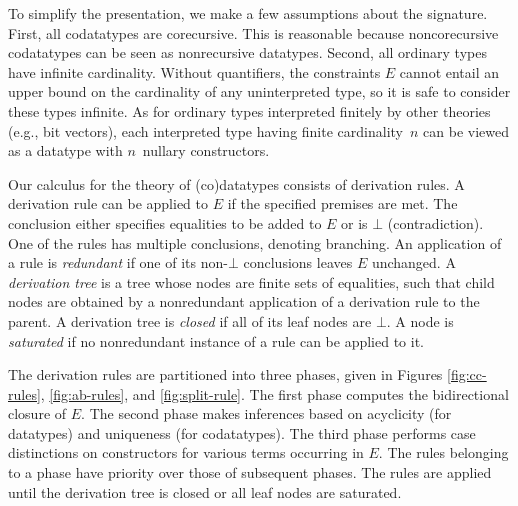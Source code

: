 \documentclass[letter]{article}
\theoremstyle{plain}
\theoremstyle{definition}
\newcommand\Sig{\mathrm{\Sigma}}
\newcommand\const[1]{\textsf{#1}}
\renewcommand{\vec}[1]{\bar #1}
\newcommand{\Ec}{E}
\newcommand\Types{\mathcalx{Y}}
\newcommand\Codata{\Types_{\mathrm{codt}}}
\newcommand\negvthinspace{\kern-0.083333em}
\begin{document}
To simplify the presentation, we make a few assumptions about
the signature. %
First, all codatatypes %
are corecursive. This is reasonable
because noncorecursive codatatypes can be seen as nonrecursive
datatypes.
Second, all ordinary types have infinite cardinality.
Without quantifiers, the constraints $\Ec$ cannot entail an upper
bound on the cardinality of any uninterpreted type, so it is safe to consider these types
infinite. As for ordinary types interpreted finitely by other theories (e.g.,
bit vectors), each interpreted type having finite cardinality~$n$
can be viewed as a %
datatype with $n$~nullary constructors.




Our calculus for the theory of (co)datatypes
consists of derivation rules.
A derivation rule can be applied to $\Ec$ if %
the specified
premises are met.
The conclusion either specifies equalities to be added to $\Ec$
or is $\bot$ (contradiction).
One of the rules has multiple conclusions, %
denoting branching.
%
An application of a rule is \emph{redundant} if one of its non-$\bot$
conclusions leaves $\Ec$ unchanged.
A \emph{derivation tree} is a %
tree whose nodes are finite sets of
equalities, such that child nodes are obtained by a nonredundant application of a
derivation rule to the parent. A derivation tree is \emph{closed} if all of
its leaf nodes are $\bot$. A node is \emph{saturated} if no nonredundant
instance of a rule can be applied to it.

The derivation rules are partitioned into three phases, given in
Figures \ref{fig:cc-rules}, \ref{fig:ab-rules}, and \ref{fig:split-rule}.
The first phase computes the bidirectional closure of $\Ec$. The second
phase makes inferences based on acyclicity (for datatypes) and uniqueness
(for codatatypes).
The third phase performs case distinctions on constructors for
various terms occurring in $\Ec$.
%
The rules belonging to a phase have priority over those of %
subsequent
phases. The rules are applied until the derivation tree is closed or all leaf nodes
are saturated.
\end{document}
